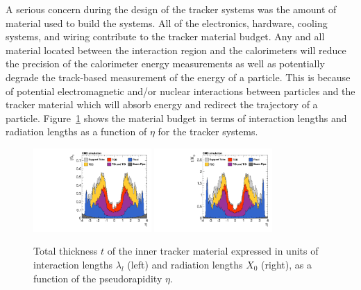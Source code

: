A serious concern during the design of the tracker systems was the amount of
material used to build the systems. All of the electronics, hardware, 
cooling systems, and wiring contribute to the tracker material budget. Any and all material
located between the interaction region and the calorimeters will reduce the precision 
of the calorimeter energy measurements as well as potentially degrade the track-based
measurement of the energy of a particle. This is because of potential electromagnetic
and/or nuclear interactions between particles and the tracker material which will
absorb energy and redirect the trajectory of a particle. Figure~\ref{fig:cms_tracker_thickness}
shows the material budget in terms of interaction lengths and radiation lengths as a function
of $\eta$ for the tracker systems.

\begin{figure}[htbp]
\centering
     \includegraphics[width=0.4\textwidth]{cms_and_lhc/plots/cms_tracker_thickness_radiationL.pdf}
     \includegraphics[width=0.4\textwidth]{cms_and_lhc/plots/cms_tracker_thickness_interactionL.pdf}
     \caption{
Total thickness $t$ of the inner tracker material expressed in units of interaction lengths 
$\lambda_{l}$ (left) and radiation lengths $X_{0}$ (right), as a function of the pseudorapidity $\eta$.
     }
     \label{fig:cms_tracker_thickness}
\end{figure}



